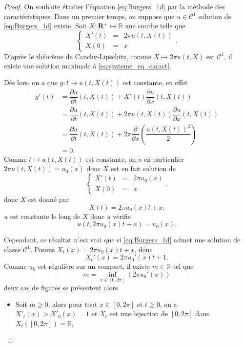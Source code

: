 \begin{proof}
On souhaite étudier l'équation \eqref{eq:Burgers_1d} par la méthode des caractéristiques. Dans un premier temps, on suppose que $u \in \mathcal{C}^1$ solution de \eqref{eq:Burgers_1d} existe. Soit $X : \mathbf{R}^+ \mapsto \mathbb{R}$ une courbe telle que
\begin{equation}
\left\lbrace
\begin{array}{rcl}
X'(t) & = & 2 \pi u (t, X(t)) \\
X(0) & = & x
\end{array}
\right. .
\label{eq:systeme_eq_caract}
\end{equation}
D'après le théorème de Cauchy-Lipschitz, comme $X \mapsto 2 \pi u (t, X)$ est $\mathcal{C}^1$, il existe une solution maximale à \eqref{eq:systeme_eq_caract}.

Dès lors, on a que $g : t \mapsto u(t,X(t))$ est constante, en effet
\begin{align*}
g'(t) & = \dfrac{\partial u}{\partial t}(t,X(t)) + X'(t) \dfrac{\partial u}{\partial x} (t,X(t)) \\
	& = \dfrac{\partial u}{\partial t}(t,X(t)) + 2 \pi u (t, X(t)) \dfrac{\partial u}{\partial x} (t,X(t)) \\
	& = \dfrac{\partial u}{\partial t}(t,X(t)) + 2 \pi  \dfrac{\partial }{\partial x} \left( \dfrac{u(t,X(t))^2}{2} \right) \\
	& = 0.
\end{align*}
Comme $t \mapsto u(t,X(t))$ est constante, on a en particulier $2 \pi u (t, X(t)) = u_0(x)$ donc $X$ est en fait solution de 
\begin{equation}
\left\lbrace
\begin{array}{rcl}
X'(t) & = & 2 \pi u_0(x) \\
X(0) & = & x
\end{array}
\right. .
\label{eq:systeme_eq_caract2}
\end{equation}
donc $X$ est donné par
\begin{equation}
X(t) = 2 \pi u_0(x) t + x.
\end{equation}
$u$ est constante le long de $X$ donc $u$ vérifie
\begin{equation}
u(t,2 \pi u_0(x)t + x)=u_0(x).
\end{equation}

Cependant, ce résultat n'est vrai que si \eqref{eq:Burgers_1d} admet une solution de classe $\mathcal{C}^1$.
Posons $X_t(x) = 2 \pi u_0(x)t + x$, donc
\begin{equation}
X_t'(x) = 2 \pi u_0'(x) t + 1.
\end{equation}
Comme $u_0$ est régulière sur un compact, il existe $m \in \mathbb{R}$ tel que
\begin{equation}
m = \inf_{x \in [0, 2 \pi]} \left( 2 \pi u_0'(x) \right)
\end{equation}
deux cas de figures se présentent alors
\begin{itemize}
\item Soit $m \geq 0$, alors pour tout $x \in [0, 2 \pi]$ et $t \geq 0$, on a $X'_t(x) > X'_0(x) = 1$ et $X_t$ est une bijection de $[0, 2 \pi]$ dans $X_t([0, 2 \pi]) = \mathbb{R}$,


\end{itemize}
\end{proof}
